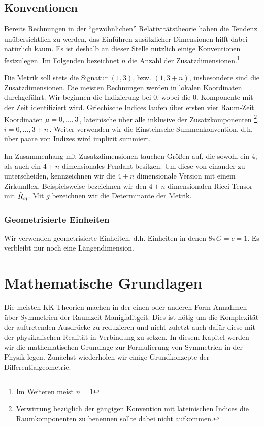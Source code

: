 \section{Konventionen}
Bereits Rechnungen in der "`gewöhnlichen"' Relativitätstheorie haben die Tendenz
unübersichtlich zu werden, das Einführen zusätzlicher Dimensionen hilft dabei
natürlich kaum.
Es ist deshalb an dieser Stelle nützlich einige Konventionen festzulegen. Im
Folgenden bezeichnet $n$ die Anzahl der Zusatzdimensionen.\footnote{Im Weiteren
meist $n=1$}

Die Metrik soll stets die Signatur $(1,3)$, bzw. $(1,3+n)$, insbesondere sind
die Zusatzdimensionen. Die meisten Rechnungen werden in lokalen Koordinaten
durchgeführt.
Wir beginnen die Indizierung bei 0, wobei die 0. Komponente mit der Zeit identifiziert wird.
Griechische Indices laufen über ersten vier Raum-Zeit Koordinaten
$\mu=0,\ldots,3\,$, lateinische über alle inklusive der
Zusatzkomponenten \footnote{Verwirrung bezüglich der gängigen Konvention
mit lateinischen Indices die Raumkomponenten zu benennen sollte dabei nicht
aufkommen.}, $i=0,\ldots,3+n\,$. Weiter verwenden wir die Einsteinsche
Summenkonvention, d.h. über paare von Indizes wird implizit summiert.

Im Zusammenhang mit Zusatzdimensionen tauchen Größen auf, die sowohl ein 4, als
auch ein $4+n$ dimensionales Pendant besitzen. Um diese von einander zu
unterscheiden, kennzeichnen wir die $4+n$ dimensionale Version mit einem
Zirkumflex.
Beispielsweise bezeichnen wir den $4+n$ dimensionalen Ricci-Tensor mit
$\tensor{\hat{R}}{_i_j}$. Mit $g$ bezeichnen wir die Determinante der Metrik.
\subsection*{Geometrisierte Einheiten}
Wir verwenden geometrisierte Einheiten, d.h. Einheiten in denen
$8\pi G=c=1$. Es verbleibt nur noch eine Längendimension.
\chapter{Mathematische Grundlagen}
Die meisten KK-Theorien machen in der einen oder anderen Form Annahmen über
Symmetrien der Raumzeit-Manigfalitgeit. Dies ist nötig um die Komplexität der
auftretenden Ausdrücke zu reduzieren und nicht zuletzt auch dafür diese mit der
physikalischen Realität in Verbindung zu setzen.
In diesem Kapitel werden wir die mathematischen Grundlage zur Formulierung von
Symmetrien in der Physik legen. Zunächst wiederholen wir einige Grundkonzepte
der Differentialgeometrie.
